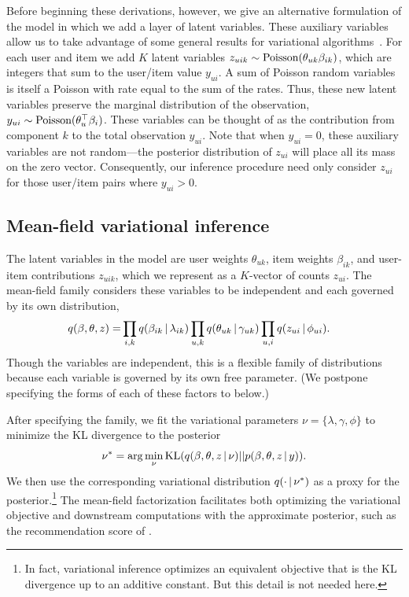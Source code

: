 \documentclass{sig-alternate}
\begin{document}

Before beginning these derivations, however, we give an alternative
formulation of the model in which we add a layer of latent variables.
These auxiliary variables allow us to take advantage of some general
results for variational
algorithms~\cite{Ghahramani:2001,Hoffman:2013}.  For each user and
item we add $K$ latent variables $z_{uik} \sim \textrm{Poisson}(\theta_{uk}
\beta_{ik})$, which are integers that sum to the user/item value
$y_{ui}$.  A sum of Poisson random variables is itself a Poisson with
rate equal to the sum of the rates.  Thus, these new latent variables
preserve the marginal distribution of the observation, $y_{ui} \sim
\textrm{Poisson}(\theta_{u}^\top \beta_{i})$.  These variables can be thought
of as the contribution from component $k$ to the total observation
$y_{ui}$.  Note that when $y_{ui} = 0$, these auxiliary variables are
not random---the posterior distribution of $z_{ui}$ will place all its
mass on the zero vector.  Consequently, our inference procedure need
only consider $z_{ui}$ for those user/item pairs where $y_{ui} > 0$.

\subsection{Mean-field variational inference} The latent variables in
the model are user weights $\theta_{uk}$, item weights $\beta_{ik}$,
and user-item contributions $z_{uik}$, which we represent as a
$K$-vector of counts $z_{ui}$.  The mean-field family considers these
variables to be independent and each governed by its own distribution,
\begin{align}
  \label{eq:q}
  q(\beta, \theta, z) =& \prod_{i,k} q(\beta_{ik} \,\vert\, \lambda_{ik})
  \prod_{u,k} q(\theta_{uk} \,\vert\, \gamma_{uk}) \prod_{u,i} q(z_{ui} \,\vert\,
  \phi_{ui}).
\end{align}
Though the variables are independent, this is a flexible family of
distributions because each variable is governed by its own free
parameter.  (We postpone specifying the forms of each of these factors
to below.)

After specifying the family, we fit the variational parameters $\nu =
\{\lambda, \gamma, \phi\}$ to minimize the KL divergence to the
posterior
\begin{equation*}
  \nu^* = \arg \min_\nu \textrm{KL}(q(\beta,
  \theta, z \,\vert\, \nu) || p(\beta, \theta, z \,\vert\, y)).
\end{equation*}
We then use the corresponding variational distribution $q(\cdot \,\vert\,
\nu^*)$ as a proxy for the posterior.\footnote{In fact, variational inference
optimizes an equivalent objective that is the KL divergence up to an
additive constant.  But this detail is not needed here.}  The
mean-field factorization facilitates both optimizing the variational
objective and downstream computations with the approximate posterior,
such as the recommendation score of .
\end{document}
